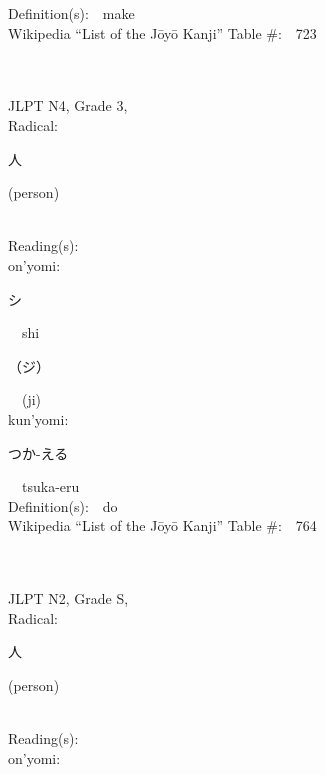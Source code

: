 \begin{multicols}{2}
Definition(s):\ \ make \\
Wikipedia ``List of the J\=oy\=o Kanji'' Table \#:\ \ 723 \\
\ \ \\
{\fontsize{34pt}{40pt}  }\ \ \\  %
{JLPT N4, Grade 3, \\Radical:\ \ {\begin{CJK}{UTF8}{min} 人 \end{CJK}} (person) } \\
Reading(s):\ \ \\
{\hspace*{1em}}on'yomi:\ \ \\
{\hspace*{2em}}{\begin{CJK}{UTF8}{min} シ \end{CJK}}\ \ shi\ \ \\
{\hspace*{2em}}{\begin{CJK}{UTF8}{min} （ジ） \end{CJK}}\ \ (ji)\ \ \\
{\hspace*{1em}}kun'yomi:\ \ \\
{\hspace*{2em}}{\begin{CJK}{UTF8}{min} つか-える \end{CJK}}\ \ tsuka-eru\ \ \\
Definition(s):\ \ do \\
Wikipedia ``List of the J\=oy\=o Kanji'' Table \#:\ \ 764 \\
\ \ \\
{\fontsize{34pt}{40pt}  }\ \ \\  %
{JLPT N2, Grade S, \\Radical:\ \ {\begin{CJK}{UTF8}{min} 人 \end{CJK}} (person) } \\
Reading(s):\ \ \\
{\hspace*{1em}}on'yomi:\ \ \\

\end{multicols}
